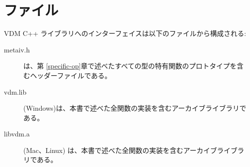 \documentclass[\pformat,12pt]{jarticle}
\begin{document}



 
\appendix
\section{ファイル} \label{files}
VDM C++ ライブラリへのインターフェイスは以下のファイルから構成される:

\begin{description}
\item[metaiv.h] は、第 \ref{specific-op}章で述べたすべての型の特有関数のプロトタイプを含むヘッダーファイルである。
  \item[vdm.lib](Windows)は、本書で述べた全関数の実装を含むアーカイブライブラリである。 
\item[libvdm.a](Mac、Linux) は、本書で述べた全関数の実装を含むアーカイブライブラリである。
\end{description}
\end{document}
